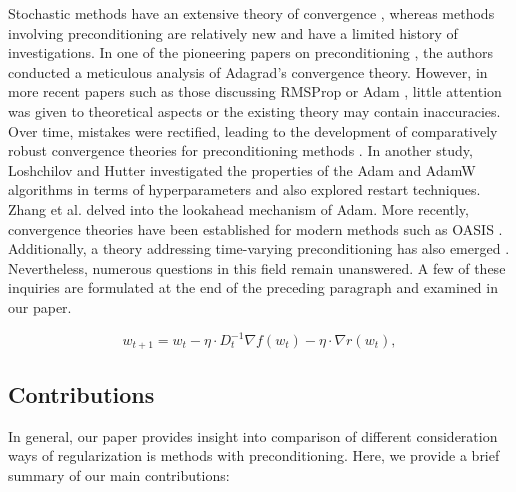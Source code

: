 \documentclass[USenglish]{article}
\theoremstyle{dgthm}
\theoremstyle{dgdef}
\begin{document}
Stochastic methods have an extensive theory of convergence \citep{schneider2007stochastic, heyman2004stochastic, spall1998implementation}, whereas methods involving preconditioning are relatively new and have a limited history of investigations.
In one of the pioneering papers on preconditioning \citep{duchi2011adaptive}, the authors conducted a meticulous analysis of Adagrad's convergence theory.
However, in more recent papers such as those discussing RMSProp \citep{rmsprop} or Adam \citep{kingma2014adam}, little attention was given to theoretical aspects or the existing theory may contain inaccuracies.
Over time, mistakes were rectified, leading to the development of comparatively robust convergence theories for preconditioning methods \citep{reddi2019convergence, defossez2020simple}.
In another study, Loshchilov and Hutter \citep{loshchilov2017decoupled} investigated the properties of the Adam and AdamW algorithms in terms of hyperparameters and also explored restart techniques.
Zhang et al. \citep{zhang2019lookahead} delved into the lookahead mechanism of Adam.
More recently, convergence theories have been established for modern methods such as OASIS \citep{goldberg2011oasis, sadiev2022stochastic}.
Additionally, a theory addressing time-varying preconditioning has also emerged \citep{beznosikov2022scaled}.
Nevertheless, numerous questions in this field remain unanswered.
A few of these inquiries are formulated at the end of the preceding paragraph and examined in our paper.

\begin{equation}
w_{t+1} = w_t - \eta \cdot D_t^{-1} \nabla f(w_t) - \eta \cdot \nabla r(w_t),
\end{equation}
\fi

\subsection{Contributions}

In general, our paper provides insight into comparison of different consideration ways of regularization is methods with preconditioning. Here, we provide a brief summary of our main contributions:
\end{document}
